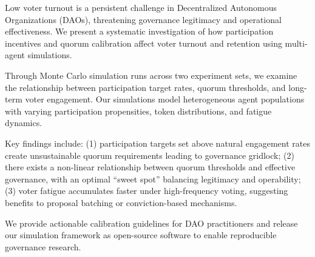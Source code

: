 
Low voter turnout is a persistent challenge in Decentralized Autonomous Organizations (DAOs), threatening governance legitimacy and operational effectiveness. We present a systematic investigation of how participation incentives and quorum calibration affect voter turnout and retention using multi-agent simulations.

Through \experimentruns{} Monte Carlo simulation runs across two experiment sets, we examine the relationship between participation target rates, quorum thresholds, and long-term voter engagement. Our simulations model heterogeneous agent populations with varying participation propensities, token distributions, and fatigue dynamics.

Key findings include: (1) participation targets set above natural engagement rates create unsustainable quorum requirements leading to governance gridlock; (2) there exists a non-linear relationship between quorum thresholds and effective governance, with an optimal ``sweet spot'' balancing legitimacy and operability; (3) voter fatigue accumulates faster under high-frequency voting, suggesting benefits to proposal batching or conviction-based mechanisms.

We provide actionable calibration guidelines for DAO practitioners and release our simulation framework as open-source software to enable reproducible governance research.
